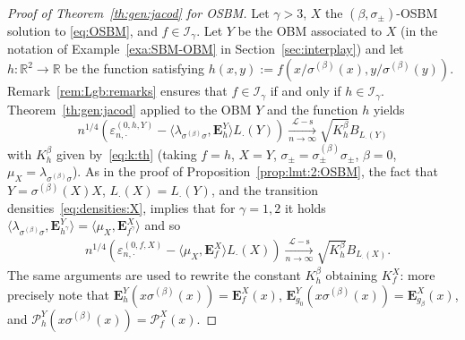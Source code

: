\documentclass[12pt]{article}
\numberwithin{equation}{section}
\theoremstyle{definition}
\theoremstyle{remark}
\newcommand{\convsl}[1][]{\xrightarrow[#1]{\mathcal{L}-\mathrm{s}}}
\newcommand{\RR}{\mathbb{R}}
\newcommand{\Lg}[1]{\mathcal{I}_{#1}}
\newcommand{\bfF}[1]{\mathbf{E}^X_{#1}}
\newcommand{\bfH}[1]{\mathbf{E}^Y_{#1}}
\begin{document}
\begin{proof}[Proof of Theorem~\ref{th:gen:jacod} for OSBM]
Let 
$\gamma >3$, $X$ the $(\beta,\sigma_\pm)$-OSBM solution to \eqref{eq:OSBM}, and $f \in \Lg{\gamma}$. 
%
Let $Y$ be the OBM associated to $X$ (in the notation of Example~\ref{exa:SBM-OBM} in Section~\ref{sec:interplay}) 
and let $h \colon \RR^2 \to \RR$ be the function satisfying $h(x,y) :=f(x/{\sigma^{(\beta)}}(x), y/{\sigma^{(\beta)}}(y))$. 
Remark~\ref{rem:Lgb:remarks} ensures that $f\in \Lg{\gamma}$ if and only if $h \in \Lg{\gamma}$.
Theorem~\ref{th:gen:jacod} applied to the OBM $Y$ and the function $h$ yields 
\begin{equation}
n^{1/4} 
	\left(  \varepsilon_{n,\cdot}^{(0,h,Y)} 
-  \langle \lambda_{\sigma^{(\beta)}\sigma} , \bfH { h } \rangle L_\cdot(Y) \right)
	\convsl[n\to \infty] \sqrt{K_{h}^\beta} B_{L_\cdot(Y)}
\end{equation}
with $K_{h}^\beta$ given by~\eqref{eq:k:th} (taking $f=h$, $X=Y$, $\sigma_\pm=\sigma_\pm^{(\beta)}\sigma_\pm$, $\beta=0$, $\mu_X=\lambda_{\sigma^{(\beta)}\sigma}$).
%
As in the proof of Proposition~\ref{prop:lmt:2:OSBM}, the fact that $Y=\sigma^{(\beta)}(X)X$, $L_{\cdot}(X)=L_{\cdot}(Y)$, and the transition densities~\eqref{eq:densities:X},
implies that for $\gamma=1,2$ it holds
$%
	\langle \lambda_{\sigma^{(\beta)}\sigma} , \bfH { h^\gamma } \rangle 
	= \langle \mu_X , \bfF { f^\gamma } \rangle 
$ %
and so
\begin{equation}
\begin{split}
&n^{1/4} 
	\left(  \varepsilon_{n,\cdot}^{(0,f,X)} 
-  \langle \mu_X , \bfF { f } \rangle L_\cdot(X) \right)
	\convsl[n\to \infty] \sqrt{K_{h}^\beta} B_{L_\cdot(X)}.
\end{split}\end{equation}
The same arguments are used to rewrite the constant $K_{h}^\beta$ obtaining $K_f^X$: more precisely note that $\bfH{h}(x \sigma^{(\beta)}(x))=\bfF { f } (x)$, $\bfH{g_0}(x \sigma^{(\beta)}(x)) = \bfF { g_\beta } (x)$, and $\mathcal{P}_{h}^Y(x \sigma^{(\beta)}(x)) = \mathcal{P}_{f}^X(x) $.
\end{proof}




\end{document}
